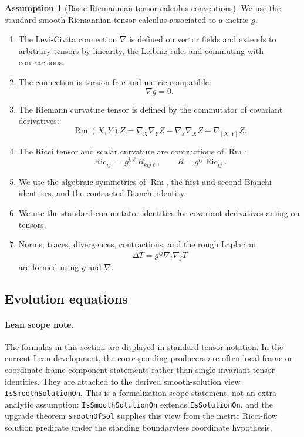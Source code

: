 \documentclass[11pt]{article}
\theoremstyle{plain}
\theoremstyle{definition}
\newtheorem{assumption}[theorem]{Assumption}
\theoremstyle{remark}
\newcommand{\Ric}{\operatorname{Ric}}
\newcommand{\Rm}{\operatorname{Rm}}
\newcommand{\leanref}[1]{\nolinkurl{#1}}
\begin{document}
\begin{assumption}[Basic Riemannian tensor-calculus conventions]
\label{ass:riemannian-calculus}
We use the standard smooth Riemannian tensor calculus associated to a metric
$g$.
\begin{enumerate}[label=(\arabic*)]
  \item The Levi-Civita connection $\nabla$ is defined on vector fields and
  extends to arbitrary tensors by linearity, the Leibniz rule, and commuting
  with contractions.

  \item The connection is torsion-free and metric-compatible:
  \[
  \nabla g=0.
  \]

  \item The Riemann curvature tensor is defined by the commutator of covariant
  derivatives:
  \[
  \Rm(X,Y)Z
  =
  \nabla_X\nabla_YZ
  -\nabla_Y\nabla_XZ
  -\nabla_{[X,Y]}Z.
  \]

  \item The Ricci tensor and scalar curvature are contractions of $\Rm$:
  \[
  \Ric_{ij}=g^{k\ell}R_{kij\ell},
  \qquad
  R=g^{ij}\Ric_{ij}.
  \]

  \item We use the algebraic symmetries of $\Rm$, the first and second Bianchi
  identities, and the contracted Bianchi identity.

  \item We use the standard commutator identities for covariant derivatives
  acting on tensors.

  \item Norms, traces, divergences, contractions, and the rough Laplacian
  \[
  \Delta T=g^{ij}\nabla_i\nabla_jT
  \]
  are formed using $g$ and $\nabla$.
\end{enumerate}
\end{assumption}

\subsection{Evolution equations}

\paragraph{Lean scope note.}
The formulas in this section are displayed in standard tensor notation.  In the
current Lean development, the corresponding producers are often local-frame or
coordinate-frame component statements rather than single invariant tensor
identities.  They are attached to the derived smooth-solution view
\leanref{IsSmoothSolutionOn}.  This is a formalization-scope statement, not an
extra analytic assumption: \leanref{IsSmoothSolutionOn} extends
\leanref{IsSolutionOn}, and the upgrade theorem \leanref{smoothOfSol} supplies
this view from the metric Ricci-flow solution predicate under the standing
boundaryless coordinate hypothesis.
\end{document}
